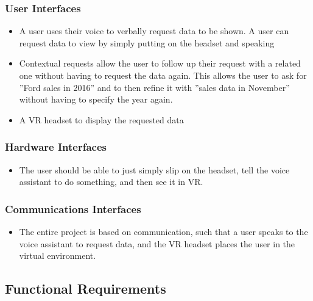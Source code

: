 \documentclass[onecolumn, draftclsnofoot,10pt, compsoc]{IEEEtran}
\begin{document}
        \subsubsection{User Interfaces}
            \begin{itemize}
                \item A user uses their voice to verbally request data to be shown. A user can request data to view by simply putting on the headset and speaking
                \item Contextual requests allow the user to follow up their request with a related one without having to request the data again. This allows the user to ask for ''Ford sales in 2016'' and to then refine it with ''sales data in November'' without having to specify the year again.
                \item A VR headset to display the requested data
            \end{itemize}
            
            \subsubsection{Hardware Interfaces}
            \begin{itemize}
                \item The user should be able to just simply slip on the headset, tell the voice assistant to do something, and then see it in VR.
            \end{itemize}
            
            \subsubsection{Communications Interfaces}
            \begin{itemize}
                \item The entire project is based on communication, such that a user speaks to the voice assistant to request data, and the VR headset places the user in the virtual environment. 
            \end{itemize}
            
    \subsection{Functional Requirements}
    
\end{document}
